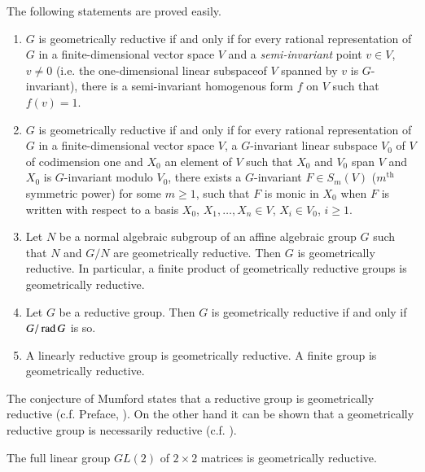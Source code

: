 The following statements are proved easily.
\begin{enumerate}
\renewcommand{\labelenumi}{(\theenumi)}
\item $G$ is geometrically reductive if and only if for every rational representation of $G$ in a finite-dimensional vector space $V$ and a {\em semi-invariant} point $v\in V$, $v\neq 0$ (i.e. the one-dimensional linear subspace\pageoriginale of $V$ spanned by $v$ is $G$-invariant), there is a semi-invariant homogenous form $f$ on $V$ such that $f(v)=1$.

\item $G$ is geometrically reductive if and only if for every rational representation of $G$ in a finite-dimensional vector space $V$, a $G$-invariant linear subspace $V_{0}$ of $V$ of codimension one and $X_{0}$ an element of $V$ such that $X_{0}$ and $V_{0}$ span $V$ and $X_{0}$ is $G$-invariant modulo $V_{0}$, there exists a $G$-invariant $F\in S_{m}(V)$ ($m^{\text{th}}$ symmetric power) for some $m\geq 1$, such that $F$ is monic in $X_{0}$ when $F$ is written with respect to a basis $X_{0}$, $X_{1},\ldots, X_{n}\in V$, $X_{i}\in V_{0}$, $i\geq 1$.

\item Let $N$ be a normal algebraic subgroup of an affine algebraic group $G$ such that $N$ and $G/N$ are geometrically reductive. Then $G$ is geometrically reductive. In particular, a finite product of geometrically reductive groups is geometrically reductive.

\item Let $G$ be a reductive group. Then $G$ is geometrically reductive if and only if $G/\operatorname{\mathrm{rad}} G$ is so.

\item A linearly reductive group is geometrically reductive. A finite group is geometrically reductive.
\end{enumerate}

The conjecture of Mumford states that a reductive group is geometrically reductive (c.f. Preface, \cite{art18-key3}). On the other hand it can be shown that a geometrically reductive group is necessarily reductive (c.f. \cite{art18-key8}).

\begin{theorem}\label{art18-thm1}
The full linear group $GL(2)$ of $2\times 2$ matrices is geometrically reductive.
\end{theorem}

